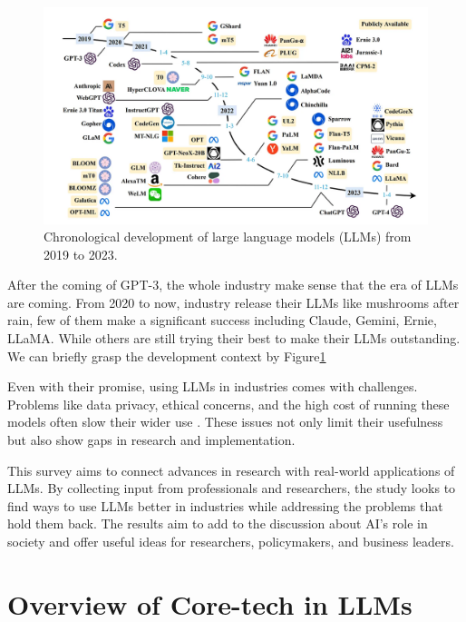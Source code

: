 \documentclass[fleqn,10pt]{SelfArx} %
\begin{document}
\begin{figure}[ht]\centering
	\includegraphics[width=\linewidth]{Figures/development.png}
	\caption{Chronological development of large language models (LLMs) from 2019 to 2023.}
	\label{fig:dev}
\end{figure}

After the coming of GPT-3, the whole industry make sense that the era of LLMs are coming. From 2020 to now, industry release their LLMs like mushrooms after rain, few of them make a significant success including Claude, Gemini, Ernie, LLaMA. While others are still trying their best to make their LLMs outstanding. We can briefly grasp the development context by Figure\ref{fig:dev}

Even with their promise, using LLMs in industries comes with challenges. Problems like data privacy, ethical concerns, and the high cost of running these models often slow their wider use \cite{Bender:2021ai}. These issues not only limit their usefulness but also show gaps in research and implementation.

This survey aims to connect advances in research with real-world applications of LLMs. By collecting input from professionals and researchers, the study looks to find ways to use LLMs better in industries while addressing the problems that hold them back. The results aim to add to the discussion about AI’s role in society and offer useful ideas for researchers, policymakers, and business leaders.


\section{Overview of Core-tech in LLMs}

\end{document}
